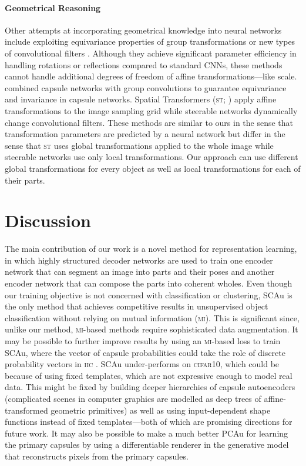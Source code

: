 \documentclass{article}
\begin{document}
\paragraph{Geometrical Reasoning}
Other attempts at incorporating geometrical knowledge into neural networks include exploiting equivariance properties of group transformations \citep{Cohen2016group} or new types of convolutional filters \citep{Mallat,Kocvok2016cyclic}.
Although they achieve significant parameter efficiency in handling rotations or reflections compared to standard \glspl{CNN}, these methods cannot handle additional degrees of freedom of affine transformations---like scale. \cite{Lenssen2018group} combined capsule networks with group convolutions to guarantee equivariance and invariance in capsule networks.
Spatial Transformers (\textsc{st}; \cite{Jaderberg2015}) apply affine transformations to the image sampling grid while steerable networks \citep{Cohen2016steerable,Jacobsen2017dynamic} dynamically change convolutional filters.
These methods are similar to ours in the sense that transformation parameters are predicted by a neural network but differ in the sense that \textsc{st} uses global transformations applied to the whole image while steerable networks use only local transformations.
Our approach can use different global transformations for every object as well as local transformations for each of their parts.


 \section{Discussion}
\label{sec:discussion}

The main contribution of our work is a novel method for representation learning, in which highly structured decoder networks are used to train one encoder network that can segment an image into parts and their poses and another encoder network that can compose the parts into coherent wholes.
Even though our training objective is not concerned with classification or clustering,
\gls{SCAu} is the only method that achieves competitive results in unsupervised object classification without relying on mutual information (\textsc{mi}).
This is significant since, unlike our method, \textsc{mi}-based methods require sophisticated data augmentation.
It may be possible to further improve results by using an \textsc{mi}-based loss to train \gls{SCAu}, where the vector of capsule probabilities could take the role of discrete probability vectors in \textsc{iic} \citep{Ji2018iic}.
\gls{SCAu} under-performs on \textsc{cifar10}, which could be because of using fixed templates, which are not expressive enough to model real data.
This might be fixed by building deeper hierarchies of capsule autoencoders (\!\eg complicated scenes in computer graphics are modelled as deep trees of affine-transformed geometric primitives) as well as using input-dependent shape functions instead of fixed templates---both of which are promising directions for future work.
It may also be possible to make a much better \gls{PCAu} for learning the primary capsules by using a differentiable renderer in the generative model that reconstructs pixels from the primary capsules.
\end{document}

